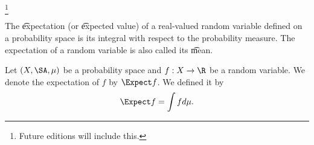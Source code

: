 
\footnote{Future editions will include this.}


The \t{expectation} (or \t{expected value}) of a real-valued random variable defined on a probability space is its integral with respect to the probability measure.
The expectation of a random variable is also called its \t{mean}.


Let $(X, \SA, \mu)$ be a probability space and $f: X \to \R$ be a random variable.
We denote the expectation of $f$ by $\Expect f$.
We defined it by
\[
  \Expect f = \int f d\mu.
\]

\blankpage
